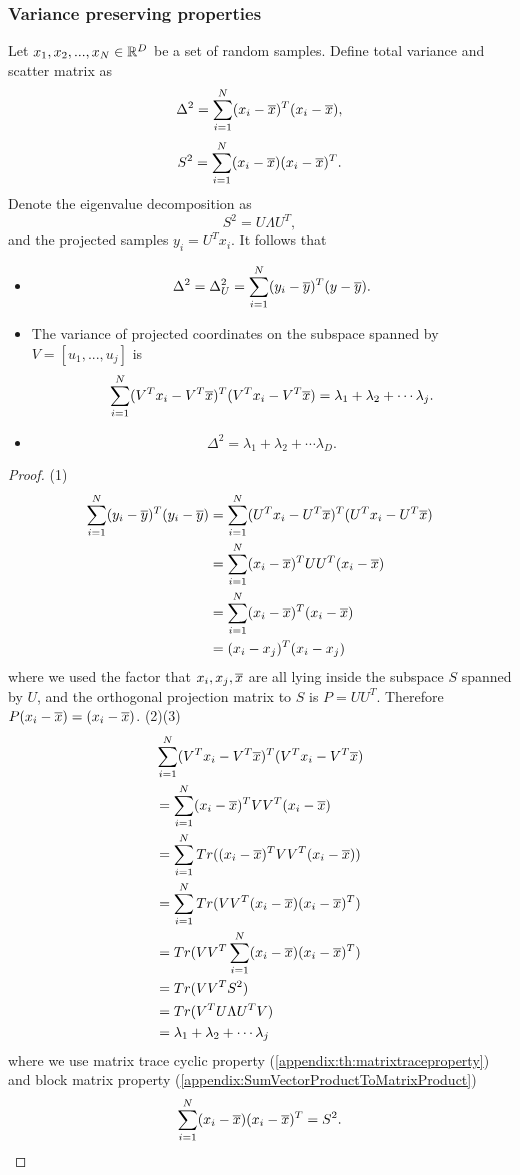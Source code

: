 \begin{refsection}
\subsubsection{Variance preserving properties}

\begin{lemma}\label{ch:statistical-learning:th:PCAVariancePreservingProperty}
Let $x_1,x_2,...,x_N \in \mathbb{R}^{D}$ be a set of random samples.
Define total variance and scatter matrix as
$$\Delta^2 = \sum_{i=1}^N (x_i - \overline{x})^T(x_i - \overline{x}),$$	
$$S^2 = \sum_{i=1}^N (x_i - \overline{x})(x_i - \overline{x})^T.$$
Denote the eigenvalue decomposition as
$$S^2 = U\Lambda U^T,$$
and the projected samples $y_i = U^Tx_i$. 
It follows that 
\begin{itemize}
	\item $$\Delta^2 = \Delta^2_U = \sum_{i=1}^N (y_i - \overline{y})^T(y - \overline{y}).$$
	
	\item The variance of projected coordinates on the subspace spanned by $V=[u_1,...,u_j]$ is
	$$\sum_{i=1}^N (V^Tx_i - V^T\overline{x})^T(V^Tx_i - V^T\overline{x}) = \lambda_1+\lambda_2+ \cdots \lambda_j.$$
	\item $$\Delta^2 = \lambda_1+\lambda_2+ \cdots \lambda_D.$$
\end{itemize}
\end{lemma}
\begin{proof}
(1)	
\begin{align*}
\sum_{i=1}^N (y_i - \overline{y})^T(y_i - \overline{y}) &= \sum_{i=1}^N (U^Tx_i - U^T\overline{x})^T(U^Tx_i - U^T\overline{x}) \\
&= \sum_{i=1}^N (x_i - \overline{x})^TUU^T(x_i - \overline{x})\\
&=  \sum_{i=1}^N (x_i - \overline{x})^T(x_i - \overline{x})\\
&= (x_i-x_j)^T(x_i-x_j)
\end{align*}	
where we used the factor that $x_i, x_j, \overline{x}$ are all lying inside the subspace $S$ spanned by $U$, and the orthogonal projection matrix to $S$ is $P=UU^T$. Therefore $P(x_i-\overline{x}) = (x_i-\overline{x})$.
(2)(3)
\begin{align*}
 & \sum_{i=1}^N (V^Tx_i - V^T\overline{x})^T(V^Tx_i - V^T\overline{x}) \\
&= \sum_{i=1}^N (x_i - \overline{x})^TVV^T(x_i - \overline{x})\\
&= \sum_{i=1}^N Tr((x_i - \overline{x})^TVV^T(x_i - \overline{x}))\\
&= \sum_{i=1}^N Tr(VV^T(x_i - \overline{x})(x_i - \overline{x})^T)\\
&=  Tr(VV^T\sum_{i=1}^N(x_i - \overline{x})(x_i - \overline{x})^T)\\
&= Tr(VV^T S^2) \\
&= Tr(V^TU\Lambda U^TV) \\
&= \lambda_1+\lambda_2+ \cdots \lambda_j
\end{align*} 	
where we use matrix trace cyclic property (\autoref{appendix:th:matrixtraceproperty}) and block matrix property (\autoref{appendix:SumVectorProductToMatrixProduct})
$$\sum_{i=1}^N(x_i - \overline{x})(x_i - \overline{x})^T = S^2.$$
\end{proof}



\end{refsection}
